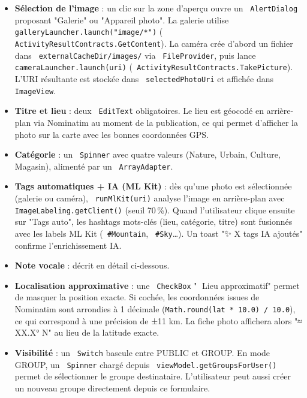 \documentclass[a4paper,12pt,openany]{report}
\newcommand{\ic}[1]{\texttt{\small\colorbox{lightbg}{\color{navy!90} #1}}}
\begin{document}
\begin{itemize}
  \item \textbf{Sélection de l'image} : un clic sur la zone d'aperçu ouvre un
    \ic{AlertDialog} proposant "Galerie" ou "Appareil photo". La galerie utilise
    \ic{galleryLauncher.launch("image/*")} (\ic{ActivityResultContracts.GetContent}).
    La caméra crée d'abord un fichier dans \ic{externalCacheDir/images/} via
    \ic{FileProvider}, puis lance \ic{cameraLauncher.launch(uri)}
    (\ic{ActivityResultContracts.TakePicture}). L'URI résultante est stockée
    dans \ic{selectedPhotoUri} et affichée dans \ic{ImageView}.

  \item \textbf{Titre et lieu} : deux \ic{EditText} obligatoires. Le lieu est
    géocodé en arrière-plan via Nominatim au moment de la publication, ce qui
    permet d'afficher la photo sur la carte avec les bonnes coordonnées GPS.

  \item \textbf{Catégorie} : un \ic{Spinner} avec quatre valeurs (Nature,
    Urbain, Culture, Magasin), alimenté par un \ic{ArrayAdapter}.

  \item \textbf{Tags automatiques + IA (ML Kit)} : dès qu'une photo est
    sélectionnée (galerie ou caméra), \ic{runMlKit(uri)} analyse l'image en
    arrière-plan avec \ic{ImageLabeling.getClient()} (seuil 70\,\%). Quand
    l'utilisateur clique ensuite sur "Tags auto", les hashtags mots-clés
    (lieu, catégorie, titre) sont fusionnés avec les labels ML Kit
    (\ic{\#Mountain}, \ic{\#Sky}…). Un toast "✨ X tags IA ajoutés"
    confirme l'enrichissement IA.

  \item \textbf{Note vocale} : décrit en détail ci-dessous.

  \item \textbf{Localisation approximative} : une \ic{CheckBox}
    "📍 Lieu approximatif" permet de masquer la position exacte. Si cochée,
    les coordonnées issues de Nominatim sont arrondies à 1 décimale
    (\texttt{Math.round(lat * 10.0) / 10.0}), ce qui correspond à une
    précision de ±11 km. La fiche photo affichera alors "≈ XX.X° N"
    au lieu de la latitude exacte.

  \item \textbf{Visibilité} : un \ic{Switch} bascule entre PUBLIC et GROUP.
    En mode GROUP, un \ic{Spinner} chargé depuis \ic{viewModel.getGroupsForUser()}
    permet de sélectionner le groupe destinataire. L'utilisateur peut aussi
    créer un nouveau groupe directement depuis ce formulaire.
\end{itemize}
\end{document}
